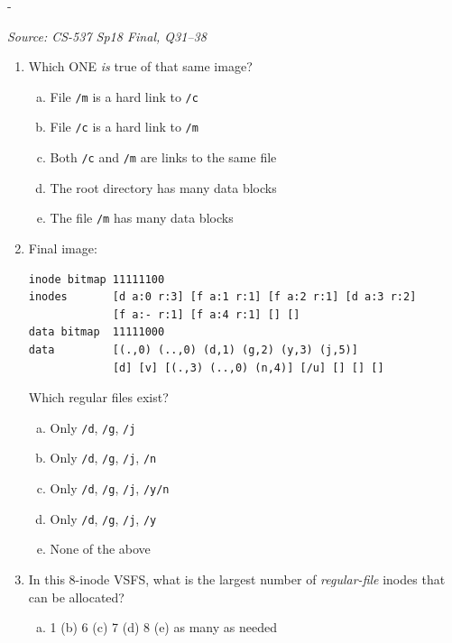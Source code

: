 \documentclass[11pt,a4paper]{article}
\makeatletter
\newcommand{\keepspace}[1]{\par\penalty-100\begingroup
  \setlength{\dimen@}{#1}\dimen@ii\pagegoal\advance\dimen@ii-\pagetotal
  \ifdim\dimen@>\dimen@ii\ifdim\dimen@ii>\z@\vfil\fi\break\fi\endgroup}
\newcounter{qn}[section]
\newenvironment{Qn}[4]{%
  \refstepcounter{qn}\keepspace{7\baselineskip}%
  \begin{tcolorbox}[qboxstyle, title={Q\thesection.\theqn\ \ [#1 \textbar\ #2]\ \ #4}]%
  {\footnotesize\color{g3}\textit{Source: #3}}\par\smallskip%
}{%
  \end{tcolorbox}%
}
\makeatother
\begin{document}
\begin{Qn}{Hard}{Lect 24}{CS-537 Sp18 Final, Q31--38}{Reconstruct a VSFS disk image}
\begin{enumerate}[(31)]
\begin{enumerate}[(a)]
      \end{enumerate}
\item Which ONE \emph{is} true of that same image?
      \begin{enumerate}[(a)]
      \item File \texttt{/m} is a hard link to \texttt{/c}
      \item File \texttt{/c} is a hard link to \texttt{/m}
      \item Both \texttt{/c} and \texttt{/m} are links to the same file
      \item The root directory has many data blocks
      \item The file \texttt{/m} has many data blocks
      \end{enumerate}
\item Final image:
\begin{lstlisting}[numbers=none]
inode bitmap 11111100
inodes       [d a:0 r:3] [f a:1 r:1] [f a:2 r:1] [d a:3 r:2]
             [f a:- r:1] [f a:4 r:1] [] []
data bitmap  11111000
data         [(.,0) (..,0) (d,1) (g,2) (y,3) (j,5)]
             [d] [v] [(.,3) (..,0) (n,4)] [/u] [] [] []
\end{lstlisting}
      Which regular files exist?
      \begin{enumerate}[(a)]
      \item Only \texttt{/d}, \texttt{/g}, \texttt{/j}
      \item Only \texttt{/d}, \texttt{/g}, \texttt{/j}, \texttt{/n}
      \item Only \texttt{/d}, \texttt{/g}, \texttt{/j}, \texttt{/y/n}
      \item Only \texttt{/d}, \texttt{/g}, \texttt{/j}, \texttt{/y}
      \item None of the above
      \end{enumerate}
\item In this 8-inode VSFS, what is the largest number of
      \emph{regular-file} inodes that can be allocated?
      \begin{enumerate}[(a)]
      \item 1 \quad (b) 6 \quad (c) 7 \quad (d) 8 \quad
      (e) as many as needed
      \end{enumerate}
\end{enumerate}
\end{Qn}
\end{document}
